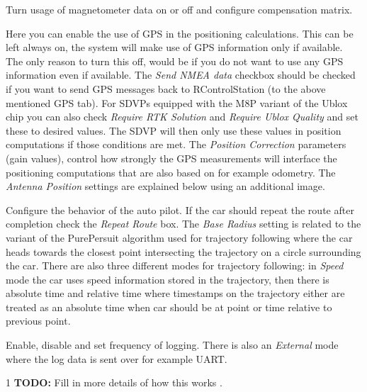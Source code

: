 \documentclass[12pt]{article} %
\def\printtodos{0}
\newcommand{\todo}[1]{
  \if\printtodos1
      {\color{red} \textbf{TODO:} #1}
  \fi}
\begin{document}
\begin{minipage}{0.6\textwidth} %
 Turn usage of magnetometer data on or
off and configure compensation matrix.

 Here you can enable the use of GPS in the
positioning calculations. This can be left always on, the system will
make use of GPS information only if available. The only reason to turn
this off, would be if you do not want to use any GPS information even
if available. The {\em Send NMEA data} checkbox should be checked if
you want to send GPS messages back to RControlStation (to the above
mentioned GPS tab). For SDVPs equipped with the M8P variant of the
Ublox chip you can also check {\em Require RTK Solution} and {\em
  Require Ublox Quality} and set these to desired values. The SDVP
will then only use these values in position computations if those
conditions are met.  The {\em Position Correction} parameters (gain
values), control how strongly the GPS measurements will interface the
positioning computations that are also based on for example odometry.
The {\em Antenna Position} settings are explained below using an
additional image.

 Configure the behavior of the auto
pilot. If the car should repeat the route after completion check the
{\em Repeat Route} box. The {\em Base Radius} setting is related to
the variant of the PurePersuit algorithm used for trajectory following
where the car heads towards the closest point intersecting the
trajectory on a circle surrounding the car. There are also three
different modes for trajectory following: in {\em Speed} mode the car
uses speed information stored in the trajectory, then there is
absolute time and relative time where timestamps on the trajectory
either are treated as an absolute time when car should be at point or
time relative to previous point.

 Enable, disable and set frequency of logging. There is
also an {\em External} mode where the log data is sent over for example UART.
\todo{Fill in more details of how this works}.
\end{minipage}
\end{document}
